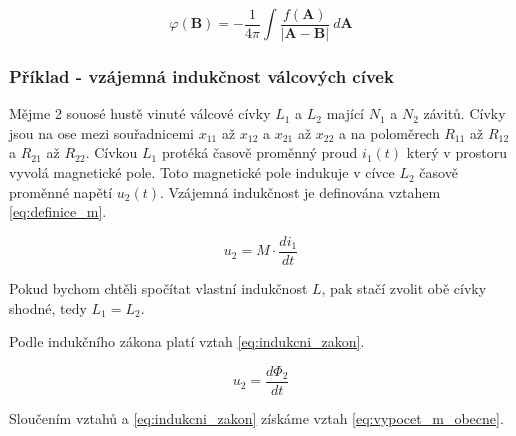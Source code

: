\documentclass{book}
\newcommand{\vect}[1]{\boldsymbol{#1}}
\begin{document}
\begin{equation}
\label{eq:potencial_v_nekonecnem_prostoru}
\varphi(\vect{B}) = -\frac{1}{4 \pi} \int \frac{f(\vect{A})}{|\vect{A} - \vect{B}|} \ d\vect{A}
\end{equation}

\subsubsection{Příklad - vzájemná indukčnost válcových cívek}

Mějme 2 souosé hustě vinuté válcové cívky \(L_1\) a \(L_2\) mající \(N_1\) a \(N_2\) závitů. Cívky jsou na ose mezi souřadnicemi \(x_{11}\) až \(x_{12}\) a \(x_{21}\) až \(x_{22}\) a na poloměrech \(R_{11}\) až \(R_{12}\) a \(R_{21}\) až \(R_{22}\). Cívkou \(L_1\) protéká časově proměnný proud \(i_1(t)\) který v prostoru vyvolá magnetické pole. Toto magnetické pole indukuje v cívce \(L_2\) časově proměnné napětí \(u_2(t)\). Vzájemná indukčnost je definována vztahem \eqref{eq:definice_m}.

\begin{equation}
\label{eq:definice_m}
u_2 = M \cdot \frac{di_1}{dt}
\end{equation}

Pokud bychom chtěli spočítat vlastní indukčnost \(L\), pak stačí zvolit obě cívky shodné, tedy \(L_1 = L_2\).



Podle indukčního zákona platí vztah \eqref{eq:indukcni_zakon}.

\begin{equation}
\label{eq:indukcni_zakon}
u_2 = \frac{d\Phi_2}{dt}
\end{equation}

Sloučením vztahů \label{eq:definice_m} a \eqref{eq:indukcni_zakon} získáme vztah \eqref{eq:vypocet_m_obecne}.
\end{document}
